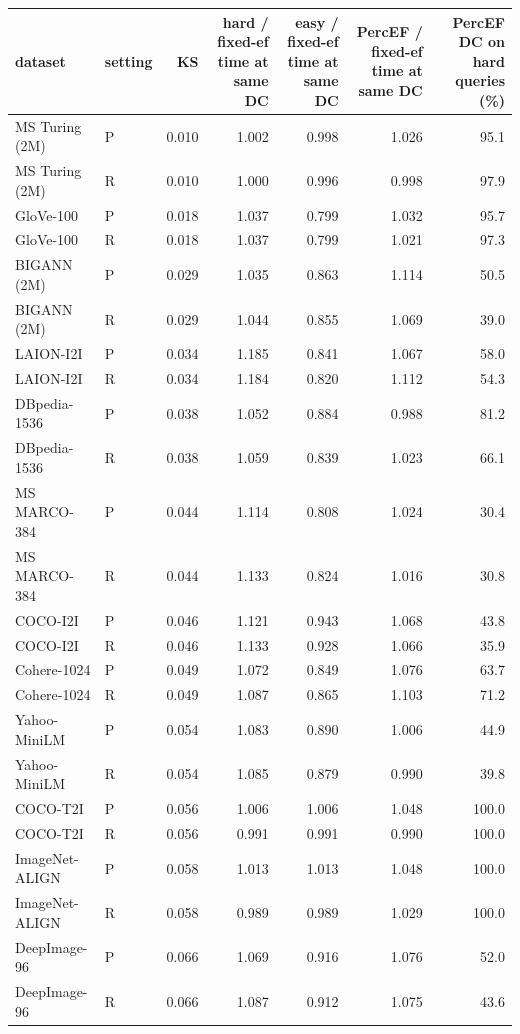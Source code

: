 \begin{tabular}{llrrrrr}
\toprule
dataset & setting & KS & hard / fixed-ef time at same DC & easy / fixed-ef time at same DC & PercEF / fixed-ef time at same DC & PercEF DC on hard queries (\%) \\
\midrule
MS Turing (2M) & P & 0.010 & 1.002 & 0.998 & 1.026 & 95.1 \\
MS Turing (2M) & R & 0.010 & 1.000 & 0.996 & 0.998 & 97.9 \\
GloVe-100 & P & 0.018 & 1.037 & 0.799 & 1.032 & 95.7 \\
GloVe-100 & R & 0.018 & 1.037 & 0.799 & 1.021 & 97.3 \\
BIGANN (2M) & P & 0.029 & 1.035 & 0.863 & 1.114 & 50.5 \\
BIGANN (2M) & R & 0.029 & 1.044 & 0.855 & 1.069 & 39.0 \\
LAION-I2I & P & 0.034 & 1.185 & 0.841 & 1.067 & 58.0 \\
LAION-I2I & R & 0.034 & 1.184 & 0.820 & 1.112 & 54.3 \\
DBpedia-1536 & P & 0.038 & 1.052 & 0.884 & 0.988 & 81.2 \\
DBpedia-1536 & R & 0.038 & 1.059 & 0.839 & 1.023 & 66.1 \\
MS MARCO-384 & P & 0.044 & 1.114 & 0.808 & 1.024 & 30.4 \\
MS MARCO-384 & R & 0.044 & 1.133 & 0.824 & 1.016 & 30.8 \\
COCO-I2I & P & 0.046 & 1.121 & 0.943 & 1.068 & 43.8 \\
COCO-I2I & R & 0.046 & 1.133 & 0.928 & 1.066 & 35.9 \\
Cohere-1024 & P & 0.049 & 1.072 & 0.849 & 1.076 & 63.7 \\
Cohere-1024 & R & 0.049 & 1.087 & 0.865 & 1.103 & 71.2 \\
Yahoo-MiniLM & P & 0.054 & 1.083 & 0.890 & 1.006 & 44.9 \\
Yahoo-MiniLM & R & 0.054 & 1.085 & 0.879 & 0.990 & 39.8 \\
COCO-T2I & P & 0.056 & 1.006 & 1.006 & 1.048 & 100.0 \\
COCO-T2I & R & 0.056 & 0.991 & 0.991 & 0.990 & 100.0 \\
ImageNet-ALIGN & P & 0.058 & 1.013 & 1.013 & 1.048 & 100.0 \\
ImageNet-ALIGN & R & 0.058 & 0.989 & 0.989 & 1.029 & 100.0 \\
DeepImage-96 & P & 0.066 & 1.069 & 0.916 & 1.076 & 52.0 \\
DeepImage-96 & R & 0.066 & 1.087 & 0.912 & 1.075 & 43.6 \\

\end{tabular}
